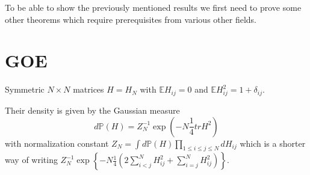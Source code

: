 To be able to show the previously mentioned results we first need to prove some other theorems which require prerequisites from various other fields.

\section{GOE}
\begin{definition}\label{def:GOE}
	Symmetric $N\times N$ matrices $H=H_N$ with $\mathbb E H_{ij}=0$ and $\mathbb E H_{ij}^2=1+\delta_{ij}$.
\end{definition}
\begin{remark}
	Their density is given by the Gaussian measure
	\begin{equation}
		d\mathbb P(H)=Z_N^{-1}\exp\left(-N\frac{1}{4}tr H^2\right)
	\end{equation}
	with normalization constant $Z_N=\int d\mathbb P(H)\prod_{1\leq i\leq j\leq N} dH_{ij}$ which is a shorter way of writing $Z_N^{-1}\exp\left\{-N\frac{1}{4}\left(2\sum_{i<j}^N H_{ij}^2+\sum_{i=j}^N H_{ij}^2\right)\right\}$.
\end{remark}

